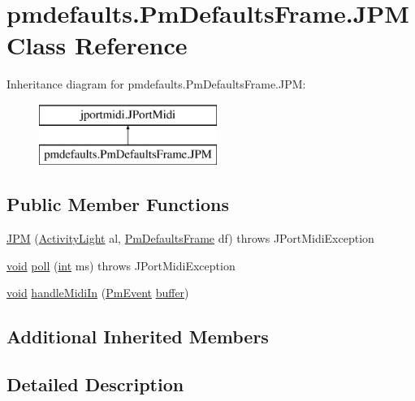 \hypertarget{classpmdefaults_1_1_pm_defaults_frame_1_1_j_p_m}{}\section{pmdefaults.\+Pm\+Defaults\+Frame.\+J\+PM Class Reference}
\label{classpmdefaults_1_1_pm_defaults_frame_1_1_j_p_m}
Inheritance diagram for pmdefaults.\+Pm\+Defaults\+Frame.\+J\+PM\+:\begin{figure}[H]
\begin{center}
\leavevmode
\includegraphics[height=2.000000cm]{classpmdefaults_1_1_pm_defaults_frame_1_1_j_p_m}
\end{center}
\end{figure}
\subsection*{Public Member Functions}
\begin{DoxyCompactItemize}
\item 
\hyperlink{classpmdefaults_1_1_pm_defaults_frame_1_1_j_p_m_a64f023379a2af97a8a968e8d8ddf7f06}{J\+PM} (\hyperlink{classpmdefaults_1_1_pm_defaults_frame_1_1_activity_light}{Activity\+Light} al, \hyperlink{classpmdefaults_1_1_pm_defaults_frame}{Pm\+Defaults\+Frame} df)  throws J\+Port\+Midi\+Exception 
\item 
\hyperlink{sound_8c_ae35f5844602719cf66324f4de2a658b3}{void} \hyperlink{classpmdefaults_1_1_pm_defaults_frame_1_1_j_p_m_a5b04565a312569e220714000dd4499c6}{poll} (\hyperlink{xmltok_8h_a5a0d4a5641ce434f1d23533f2b2e6653}{int} ms)  throws J\+Port\+Midi\+Exception 
\item 
\hyperlink{sound_8c_ae35f5844602719cf66324f4de2a658b3}{void} \hyperlink{classpmdefaults_1_1_pm_defaults_frame_1_1_j_p_m_aff40fa90887a3d502c76211f1f4d252e}{handle\+Midi\+In} (\hyperlink{struct_pm_event}{Pm\+Event} \hyperlink{structbuffer}{buffer})
\end{DoxyCompactItemize}
\subsection*{Additional Inherited Members}


\subsection{Detailed Description}


